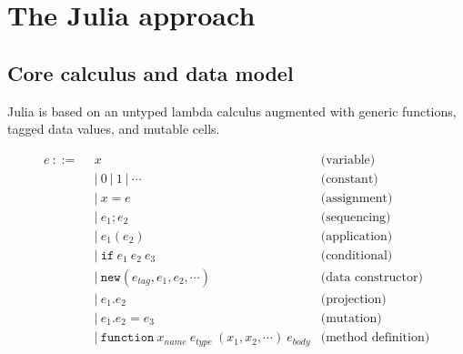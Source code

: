 \chapter{The Julia approach}

\section{Core calculus and data model}
\label{sec:corecalc}

Julia is based on an untyped lambda calculus augmented with generic functions,
tagged data values, and mutable cells.

\vspace{-3ex}
\begin{singlespace}
\begin{align*}
  e\ ::=\ &\ x                 & \textrm{(variable)} \\
        &\ |\ 0\ |\ 1\ |\ \cdots     & \textrm{(constant)} \\
        &\ |\ x = e          & \textrm{(assignment)} \\
        &\ |\ e_1; e_2       & \textrm{(sequencing)} \\
        &\ |\ e_1(e_2)       & \textrm{(application)} \\
        &\ |\ \texttt{if}\ e_1\ e_2\ e_3 & \textrm{(conditional)} \\
        &\ |\ \texttt{new}(e_{tag}, e_1, e_2, \cdots) & \textrm{(data constructor)} \\
        &\ |\ e_1.e_2        & \textrm{(projection)} \\
        &\ |\ e_1.e_2 = e_3  & \textrm{(mutation)} \\
        &\ |\ \texttt{function}\ x_{name}\ e_{type}\ (x_1, x_2, \cdots)\ e_{body} & \textrm{(method definition)}
\end{align*}
\end{singlespace}

